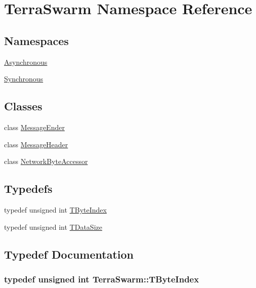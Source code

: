 \hypertarget{namespace_terra_swarm}{\section{Terra\-Swarm Namespace Reference}
\label{namespace_terra_swarm}
}
\subsection*{Namespaces}
\begin{DoxyCompactItemize}
\item 
\hyperlink{namespace_terra_swarm_1_1_asynchronous}{Asynchronous}
\item 
\hyperlink{namespace_terra_swarm_1_1_synchronous}{Synchronous}
\end{DoxyCompactItemize}
\subsection*{Classes}
\begin{DoxyCompactItemize}
\item 
class \hyperlink{class_terra_swarm_1_1_message_ender}{Message\-Ender}
\item 
class \hyperlink{class_terra_swarm_1_1_message_header}{Message\-Header}
\item 
class \hyperlink{class_terra_swarm_1_1_network_byte_accessor}{Network\-Byte\-Accessor}
\end{DoxyCompactItemize}
\subsection*{Typedefs}
\begin{DoxyCompactItemize}
\item 
typedef unsigned int \hyperlink{namespace_terra_swarm_a5f9f404900316abc28c8bd2cbaa8fb4b}{T\-Byte\-Index}
\item 
typedef unsigned int \hyperlink{namespace_terra_swarm_a092e6ec9739175076ae3106783f5c1b6}{T\-Data\-Size}
\end{DoxyCompactItemize}


\subsection{Typedef Documentation}
\hypertarget{namespace_terra_swarm_a5f9f404900316abc28c8bd2cbaa8fb4b}{
\subsubsection[{T\-Byte\-Index}]{\setlength{\rightskip}{0pt plus 5cm}typedef unsigned int {\bf Terra\-Swarm\-::\-T\-Byte\-Index}}}\label{namespace_terra_swarm_a5f9f404900316abc28c8bd2cbaa8fb4b}


